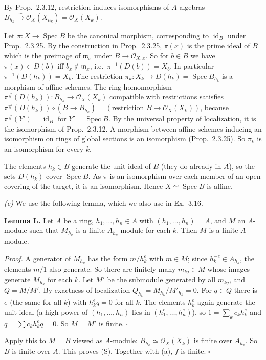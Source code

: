 \documentclass[11pt]{article}
\begin{document}
By Prop.~2.3.12, restriction induces isomorphisms of $A$-algebras $B_{h_k}\xrightarrow{\sim}\mathcal{O}_X(X_{h_k})=\mathcal{O}_X(X_k)$.

Let $\pi:X\to\operatorname{Spec}B$ be the canonical morphism, corresponding to $\operatorname{id}_B$ under Prop.~2.3.25. By the construction in Prop.~2.3.25, $\pi(x)$ is the prime ideal of $B$ which is the preimage of $\mathfrak{m}_x$ under $B\to\mathcal{O}_{X,x}$. So for $b\in B$ we have $\pi(x)\in D(b)$ iff $b_x\notin\mathfrak m_x$, i.e.\ $\pi^{-1}(D(b))=X_b$. In particular $\pi^{-1}(D(h_k))=X_k$. The restriction $\pi_k:X_k\to D(h_k)=\operatorname{Spec}B_{h_k}$ is a morphism of affine schemes. The ring homomorphism $\pi^\#(D(h_k)):B_{h_k}\to\mathcal{O}_X(X_k)$ compatible with restrictions satisfies $\pi^\#(D(h_k))\circ(B\to B_{h_k})=(\text{restriction }B\to\mathcal{O}_X(X_k))$, because $\pi^\#(Y')=\operatorname{id}_B$ for $Y'=\operatorname{Spec}B$. By the universal property of localization, it is the isomorphism of Prop.~2.3.12. A morphism between affine schemes inducing an isomorphism on rings of global sections is an isomorphism (Prop.~2.3.25). So $\pi_k$ is an isomorphism for every $k$.

The elements $h_k\in B$ generate the unit ideal of $B$ (they do already in $A$), so the sets $D(h_k)$ cover $\operatorname{Spec}B$. As $\pi$ is an isomorphism over each member of an open covering of the target, it is an isomorphism. Hence $X\simeq\operatorname{Spec}B$ is affine.

\emph{(c)} We use the following lemma, which we also use in Ex.~3.16.

\textbf{Lemma L.} Let $A$ be a ring, $h_1,\dots,h_n\in A$ with $(h_1,\dots,h_n)=A$, and $M$ an $A$-module such that $M_{h_k}$ is a finite $A_{h_k}$-module for each $k$. Then $M$ is a finite $A$-module.

\emph{Proof.} A generator of $M_{h_k}$ has the form $m/h_k^e$ with $m\in M$; since $h_k^{-e}\in A_{h_k}$, the elements $m/1$ also generate. So there are finitely many $m_{kj}\in M$ whose images generate $M_{h_k}$ for each $k$. Let $M'$ be the submodule generated by all $m_{kj}$, and $Q=M/M'$. By exactness of localization $Q_{h_k}=M_{h_k}/M'_{h_k}=0$. For $q\in Q$ there is $e$ (the same for all $k$) with $h_k^eq=0$ for all $k$. The elements $h_k^e$ again generate the unit ideal (a high power of $(h_1,\dots,h_n)$ lies in $(h_1^e,\dots,h_n^e)$), so $1=\sum_kc_kh_k^e$ and $q=\sum c_kh_k^eq=0$. So $M=M'$ is finite. $\square$

Apply this to $M=B$ viewed as $A$-module: $B_{h_k}\simeq\mathcal{O}_X(X_k)$ is finite over $A_{h_k}$. So $B$ is finite over $A$. This proves (S). Together with (a), $f$ is finite. \hfill$\square$
\end{document}
